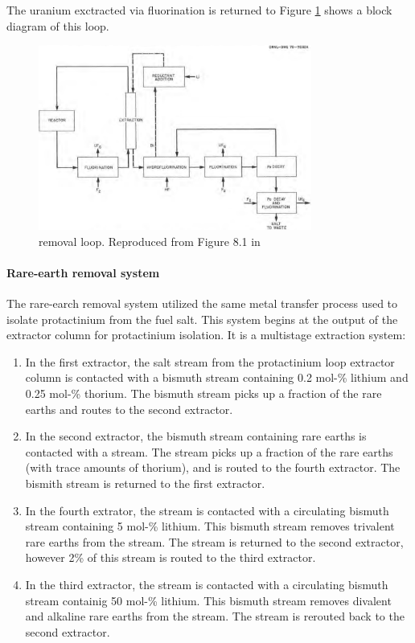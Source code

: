 The uranium exctracted via fluorination is returned to 
Figure \ref{fig:pa-removal} shows a block diagram of this loop. 

\begin{figure}[htpb]
    \centering
    \includegraphics[width=0.8\textwidth]{figs/ch4/pa_removal_loop.png}
    \caption{ removal loop. Reproduced from Figure 8.1 in \cite{robertson_conceptual_1971}}
    \label{fig:pa-removal}
\end{figure}

\paragraph{Rare-earth removal system}
The rare-earch removal system utilized the same metal transfer process used to
isolate protactinium from the fuel salt\cite{robertson_conceptual_1971}. This
system begins at the output of the extractor column for protactinium isolation.
It is a multistage extraction system:
\begin{enumerate}
    \item In the first extractor, the salt stream from the protactinium loop
    extractor column is contacted with a bismuth stream containing 0.2 mol-\%
    lithium and 0.25 mol-\% thorium. The bismuth stream picks up a fraction of
    the rare earths and routes to the second extractor.
    \item In the second extractor, the bismuth stream containing rare earths is
    contacted with a  stream.  The  stream picks up a fraction
    of the rare earths (with trace amounts of thorium), and is routed to the
    fourth extractor. The bismith stream is returned to the first extractor.
    \item In the fourth extrator, the  stream is contacted with a
    circulating bismuth stream containing 5 mol-\% lithium. This bismuth stream
    removes trivalent rare earths from the  stream. The 
    stream is returned to the second extractor, however 2\% of this 
    stream is routed to the third extractor.
    \item In the third extractor, the  stream is contacted with a
    circulating bismuth stream containig 50 mol-\% lithium. This bismuth stream
    removes divalent and alkaline rare earths from the  stream. The
     stream is rerouted back to the second extractor.
\end{enumerate}

